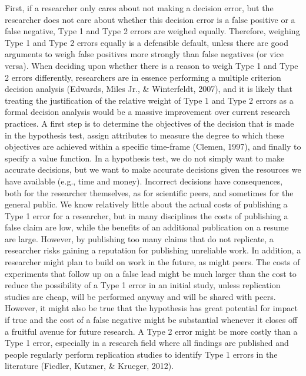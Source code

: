 \documentclass[
  english,
  ,man, a4paper,floatsintext]{apa6}
\begin{document}
First, if a researcher only cares about not making a decision error, but the researcher does not care about whether this decision error is a false positive or a false negative, Type 1 and Type 2 errors are weighed equally. Therefore, weighing Type 1 and Type 2 errors equally is a defensible default, unless there are good arguments to weigh false positives more strongly than false negatives (or vice versa). When deciding upon whether there is a reason to weigh Type 1 and Type 2 errors differently, researchers are in essence performing a multiple criterion decision analysis (Edwards, Miles Jr., \& Winterfeldt, 2007), and it is likely that treating the justification of the relative weight of Type 1 and Type 2 errors as a formal decision analysis would be a massive improvement over current research practices. A first step is to determine the objectives of the decision that is made in the hypothesis test, assign attributes to measure the degree to which these objectives are achieved within a specific time-frame (Clemen, 1997), and finally to specify a value function.
In a hypothesis test, we do not simply want to make accurate decisions, but we want to make accurate decisions given the resources we have available (e.g., time and money). Incorrect decisions have consequences, both for the researcher themselves, as for scientific peers, and sometimes for the general public. We know relatively little about the actual costs of publishing a Type 1 error for a researcher, but in many disciplines the costs of publishing a false claim are low, while the benefits of an additional publication on a resume are large. However, by publishing too many claims that do not replicate, a researcher risks gaining a reputation for publishing unreliable work. In addition, a researcher might plan to build on work in the future, as might peers. The costs of experiments that follow up on a false lead might be much larger than the cost to reduce the possibility of a Type 1 error in an initial study, unless replication studies are cheap, will be performed anyway and will be shared with peers. However, it might also be true that the hypothesis has great potential for impact if true and the cost of a false negative might be substantial whenever it closes off a fruitful avenue for future research. A Type 2 error might be more costly than a Type 1 error, especially in a research field where all findings are published and people regularly perform replication studies to identify Type 1 errors in the literature (Fiedler, Kutzner, \& Krueger, 2012).
\end{document}
